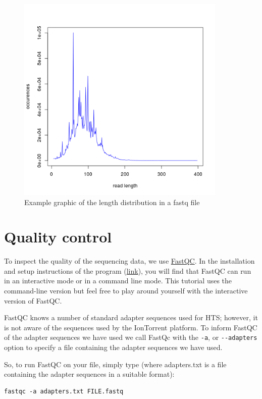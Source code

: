 \documentclass[11pt]{article}
\begin{document}
\begin{figure}[htb]
\centering
\includegraphics[width=10cm]{SequenceLengthDistribution.png}
\caption{Example graphic of the length distribution in a fastq file}
\end{figure}




\section{Quality control}
\label{sec-2}
To inspect the quality of the sequencing data, we use
\href{http://www.bioinformatics.babraham.ac.uk/projects/fastqc/}{FastQC}. In
the installation and setup instructions of the program
(\href{http://www.bioinformatics.babraham.ac.uk/projects/fastqc/INSTALL.txt}{link}),
you will find that FastQC can run in an interactive mode or in a
command line mode. This tutorial uses the command-line version but
feel free to play around yourself with the interactive version of
FastQC.

FastQC knows a number of standard adapter sequences used for HTS; however,
it is not aware of the sequences used by the IonTorrent platform. To
inform FastQC of the adapter sequences we have used we call FastQc with the
\texttt{-a}, or \texttt{-{}-adapters} option to specify a file containing the adapter
sequences we have used.

So, to run FastQC on your file, simply type (where adapters.txt is a file
containing the adapter sequences in a suitable format):

\begin{verbatim}
fastqc -a adapters.txt FILE.fastq
\end{verbatim}
\end{document}

